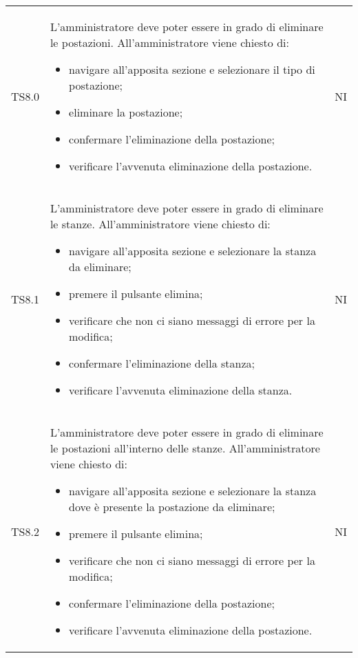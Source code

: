 {\begin{longtable}{ c C{11cm} c }
        TS8.0&
        L'amministratore deve poter essere in grado di eliminare le postazioni.\newline
        All'amministratore viene chiesto di:
        \begin{itemize}
            \item navigare all'apposita sezione e selezionare il tipo di postazione;
            \item eliminare la postazione;
            \item confermare l'eliminazione della postazione;
            \item verificare l'avvenuta eliminazione della postazione.
        \end{itemize}&
        NI\\

        TS8.1&
        L'amministratore deve poter essere in grado di eliminare le stanze.\newline
        All'amministratore viene chiesto di:
        \begin{itemize}
            \item navigare all'apposita sezione e selezionare la stanza da eliminare;
            \item premere il pulsante elimina;
            \item verificare che non ci siano messaggi di errore per la modifica;
            \item confermare l'eliminazione della stanza;
            \item verificare l'avvenuta eliminazione della stanza.
        \end{itemize}&
        NI\\

        TS8.2&
        L'amministratore deve poter essere in grado di eliminare le postazioni all'interno delle stanze.\newline
        All'amministratore viene chiesto di:
        \begin{itemize}
            \item navigare all'apposita sezione e selezionare la stanza dove è presente la postazione da eliminare;
            \item premere il pulsante elimina;
            \item verificare che non ci siano messaggi di errore per la modifica;
            \item confermare l'eliminazione della postazione;
            \item verificare l'avvenuta eliminazione della postazione.
        \end{itemize}&
        NI\\


\end{longtable}}
